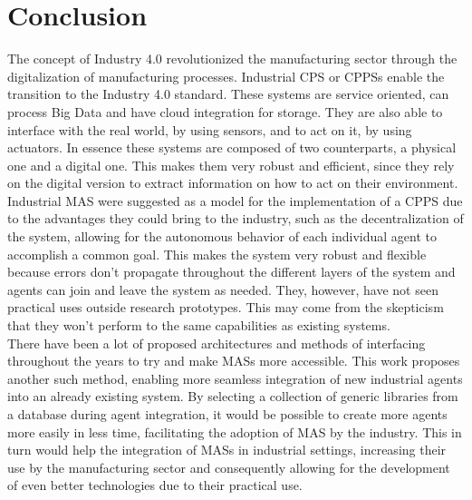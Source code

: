 

\glsresetall

\chapter{Conclusion}
\label{cha:conclusion}

The concept of Industry 4.0 revolutionized the manufacturing sector through the digitalization of manufacturing processes. Industrial \gls{CPS} or \gls{CPPS}s enable the transition to the Industry 4.0 standard. These systems are service oriented, can process Big Data and have cloud integration for storage. They are also able to interface with the real world, by using sensors, and to act on it, by using actuators. In essence these systems are composed of two counterparts, a physical one and a digital one. This makes them very robust and efficient, since they rely on the digital version to extract information on how to act on their environment.\\

Industrial \gls{MAS} were suggested as a model for the implementation of a \gls{CPPS} due to the advantages they could bring to the industry, such as the decentralization of the system, allowing for the autonomous behavior of each individual agent to accomplish a common goal. This makes the system very robust and flexible because errors don't propagate throughout the different layers of the system and agents can join and leave the system as needed. They, however, have not seen practical uses outside research prototypes. This may come from the skepticism that they won't perform to the same capabilities as existing systems.\\

There have been a lot of proposed architectures and methods of interfacing throughout the years to try and make \gls{MAS}s more accessible. This work proposes another such method, enabling more seamless integration of new industrial agents into an already existing system. By selecting a collection of generic libraries from a database during agent integration, it would be possible to create more agents more easily in less time, facilitating the adoption of \gls{MAS} by the industry. This in turn would help the integration of \gls{MAS}s in industrial settings, increasing their use by the manufacturing sector and consequently allowing for the development of even better technologies due to their practical use.